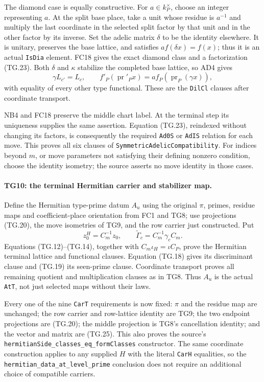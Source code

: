 \documentclass[11pt,a4paper]{article}
\numberwithin{equation}{section}
\theoremstyle{remark}\newtheorem{remark}[theorem]{Remark}
\begin{document}
The diamond case is equally constructive. For $a\in k_P^\times$,
choose an integer representing $a$. At the split base place,
take a unit whose residue is $a^{-1}$ and multiply the last
coordinate in the selected split factor by that unit and in
the other factor by its inverse. Set the adelic matrix $\delta$
to be the identity elsewhere. It is unitary, preserves the base
lattice, and satisfies $a f(\delta x)=f(x)$; thus it is an
actual \texttt{IsDia} element. FC18 gives the exact diamond
class and a factorization (TG.23). Both $\delta$ and $\kappa$
stabilize the completed base lattice, so AD4 gives
\[
 \gamma L_{c'}=L_c,\qquad
 f'_{P}(\operatorname{pr}'_P x)
        =a f_P(\operatorname{pr}_P(\gamma x)),
 \tag{TG.24}
\]
with equality of every other type functional. These are the
\texttt{DilCl} clauses after coordinate transport.

NB4 and FC18 preserve the middle chart label. At the terminal
step its uniqueness supplies the same assertion. Equation
(TG.23), reindexed without changing its factors, is consequently
the required \texttt{Ad0S} or \texttt{AdIS} relation for each
move. This proves all six clauses of
\texttt{SymmetricAdelicCompatibility}. For indices beyond $m$,
or move parameters not satisfying their defining nonzero
condition, choose the identity isometry; the source asserts no
move identity in those cases.

\paragraph{TG10: the terminal Hermitian carrier and stabilizer map.}
Define the Hermitian type-prime datum $A_u$ using the original
$\pi$, primes, residue maps and coefficient-place orientation
from FC1 and TG8; use projections (TG.20), the move isometries
of TG9, and the row carrier just constructed. Put
\[
 z_0^H=C_m^{-1}z_0,\qquad
 \widetilde\Gamma_c=C_m^{-1}\gamma_c C_m.
 \tag{TG.25}
\]
Equations (TG.12)--(TG.14), together with
$C_m\iota_H=\iota C_P$, prove the Hermitian terminal lattice
and functional clauses. Equation (TG.18) gives its discriminant
clause and (TG.19) its seen-prime clause. Coordinate transport
proves all remaining quotient and multiplication clauses as in
TG8. Thus $A_u$ is the actual \texttt{AtT}, not just selected
maps without their laws.

Every one of the nine \texttt{CarT} requirements is now fixed:
$\pi$ and the residue map are unchanged; the row carrier and
row-lattice identity are TG9; the two endpoint projections are
(TG.20); the middle projection is TG8's cancellation identity;
and the vector and matrix are (TG.25). This also proves the
source's \texttt{hermitianSide\_\allowbreak classes\_\allowbreak eq\_\allowbreak formClasses}
constructor. The same coordinate construction applies to any
supplied $H$ with the literal \texttt{CarH} equalities, so the
\texttt{hermitian\_\allowbreak data\_\allowbreak at\_\allowbreak level\_\allowbreak prime} conclusion does
not require an additional choice of compatible carriers.
\end{document}
